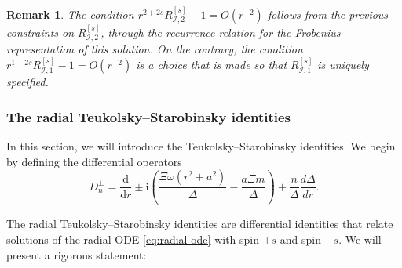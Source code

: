 \documentclass[11pt]{article}
\newtheorem{remark}[proposition]{Remark}
\newcommand{\dd}{\mathrm{d}}
\newcommand{\ii}{\mathrm{i}}
\newcommand{\cI}{\mathcal I}
\numberwithin{equation}{section}
\begin{document}
\begin{remark} The condition $r^{2+2s}R^{[s]}_{\cI,2}-1=O(r^{-2})$ follows from the previous constraints on $R^{[s]}_{\cI,2}$, through the recurrence relation for the Frobenius representation of this solution. On the contrary, the condition $r^{1+2s}R^{[s]}_{\cI,1}-1=O(r^{-2})$ is a {\normalfont choice} that is made so that $R^{[s]}_{\cI,1}$ is uniquely specified.
\end{remark}


\subsubsection{The radial Teukolsky--Starobinsky identities}

In this section, we will introduce the Teukolsky--Starobinsky identities. We begin by defining the differential operators
\begin{equation}\label{eq:Dpm-KAdS}
        D^{\pm}_n=\frac{\dd}{\dd r}\pm\ii\left(\frac{\Xi\omega(r^2+a^2)}{\Delta}-\frac{a\Xi m}{\Delta}\right)+\frac{n}{\Delta}\frac{d\Delta}{dr}.
\end{equation}

The radial Teukolsky--Starobinsky identities are differential identities that relate solutions of the  radial ODE \eqref{eq:radial-ode} with spin $+s$ and spin $-s$. We will present a rigorous statement:
\end{document}
